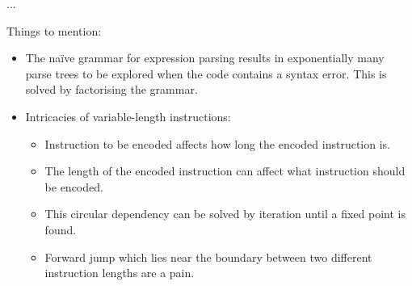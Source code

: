 ...

{
  \color{red}
  Things to mention:

  \begin{itemize}
    \item
      The na\"ive grammar for expression parsing results in exponentially many
      parse trees to be explored when the code contains a syntax error. This is
      solved by factorising the grammar.
    \item
      Intricacies of variable-length instructions:
      \begin{itemize}
        \item
          Instruction to be encoded affects how long the encoded instruction is.
        \item
          The length of the encoded instruction can affect what instruction
          should be encoded.
        \item
          This circular dependency can be solved by iteration until a fixed
          point is found.
        \item
          Forward jump which lies near the boundary between two different
          instruction lengths are a pain.
      \end{itemize}
  \end{itemize}
}
